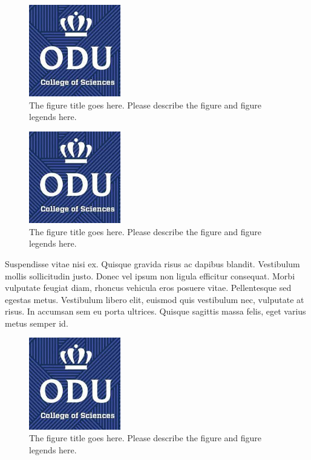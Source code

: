 \begin{figure}[tbh]
  \centering
  \includegraphics[height=4cm]{Figures/cos1.jpeg}
  \caption[The figure title goes here.]{The figure title goes here. Please describe the figure and figure legends here.}
  \label{fig:cos1_16}
\end{figure}


\begin{figure}[tbh]
  \centering
  \includegraphics[height=4cm]{Figures/cos1.jpeg}
  \caption[The figure title goes here.]{The figure title goes here. Please describe the figure and figure legends here.}
  \label{fig:cos1_17}
\end{figure}

Suspendisse vitae nisi ex. Quisque gravida risus ac dapibus blandit. Vestibulum mollis sollicitudin justo. Donec vel ipsum non ligula efficitur consequat. Morbi vulputate feugiat diam, rhoncus vehicula eros posuere vitae. Pellentesque sed egestas metus. Vestibulum libero elit, euismod quis vestibulum nec, vulputate at risus. In accumsan sem eu porta ultrices. Quisque sagittis massa felis, eget varius metus semper id. 



\begin{figure}[tbh]
  \centering
  \includegraphics[height=4cm]{Figures/cos1.jpeg}
  \caption[The figure title goes here.]{The figure title goes here. Please describe the figure and figure legends here.}
  \label{fig:cos1_18}
\end{figure}


